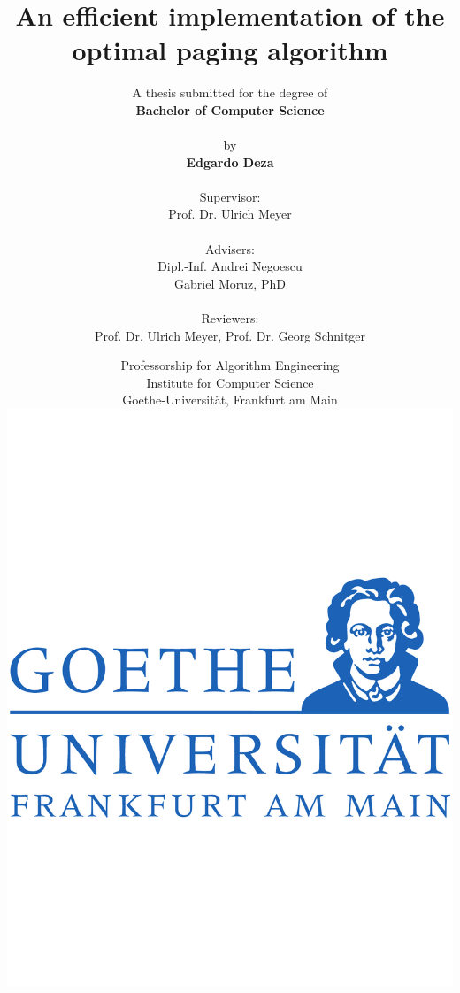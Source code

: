 \documentclass[a4paper,12pt, titlepage]{article}  %
\begin{document}
\begin{titlepage}
	\title{\textbf{An efficient implementation of the optimal paging algorithm}}
	
	\author{
	A thesis submitted for the degree of \\
	\textbf{Bachelor of Computer Science} \\
	\\
	by \\
	\textbf{Edgardo Deza}\\
	\\
	\large Supervisor: \\
	\normalsize Prof. Dr. Ulrich Meyer\\
	\\
	\large Advisers:\\
	\normalsize Dipl.-Inf. Andrei Negoescu\\
	\normalsize Gabriel Moruz, PhD\\
       \\
        \large Reviewers:\\
        \normalsize Prof. Dr. Ulrich Meyer, Prof. Dr. Georg Schnitger\\   %
	}
	\date{
	\normalsize Professorship for Algorithm Engineering\\
	\normalsize Institute for Computer Science\\
	\normalsize Goethe-Universit\"at, Frankfurt am Main\\
	\includegraphics[scale=0.23]{./figures/Goethe-logo.pdf}
	}
\end{titlepage}
\end{document}
